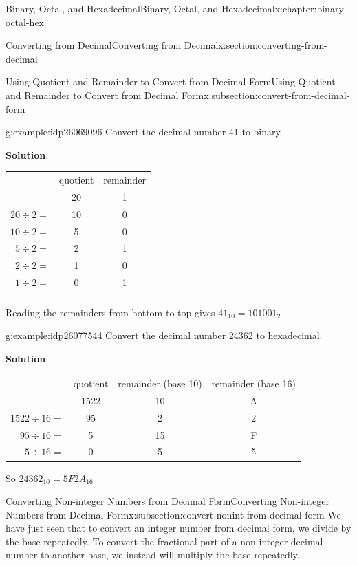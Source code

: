 \documentclass[twoside,10pt,]{book}
\newcommand{\blocktitlefont}{\relax}
\newcommand{\tabularfont}{\relax}
\numberwithin{equation}{section}
\newcommand{\hrulemedium}{\noalign{\hrule height 0.07em}}
\newcommand{\hrulethick} {\noalign{\hrule height 0.11em}}
\begin{document}
\begin{chapterptx}{Binary, Octal, and Hexadecimal}{}{Binary, Octal, and Hexadecimal}{}{}{x:chapter:binary-octal-hex}
\begin{sectionptx}{Converting from Decimal}{}{Converting from Decimal}{}{}{x:section:converting-from-decimal}
\begin{subsectionptx}{Using Quotient and Remainder to Convert from Decimal Form}{}{Using Quotient and Remainder to Convert from Decimal Form}{}{}{x:subsection:convert-from-decimal-form}
\begin{example}{}{g:example:idp26069096}%
Convert the decimal number 41 to binary.\par\smallskip%
\noindent\textbf{\blocktitlefont Solution}.\label{g:solution:idp26066920}{}\hypertarget{g:solution:idp26066920}{}\quad{}\begin{center}%
{\tabularfont%
\begin{tabular}{ccc}\hrulethick
&quotient&remainder\tabularnewline\hrulemedium
\multicolumn{1}{r}{\(41\div 2=\)}&20&1\tabularnewline[0pt]
\multicolumn{1}{r}{\(20\div 2=\)}&10&0\tabularnewline[0pt]
\multicolumn{1}{r}{\(10\div 2 =\)}&5&0\tabularnewline[0pt]
\multicolumn{1}{r}{\(5\div 2=\)}&2&1\tabularnewline[0pt]
\multicolumn{1}{r}{\(2\div 2=\)}&1&0\tabularnewline[0pt]
\multicolumn{1}{r}{\(1\div 2=\)}&0&1\tabularnewline\hrulethick
\end{tabular}
}%
\end{center}%
 Reading the remainders from bottom to top gives \(41_{10}=101001_2\)\end{example}
\begin{example}{}{g:example:idp26077544}%
Convert the decimal number 24362 to hexadecimal.\par\smallskip%
\noindent\textbf{\blocktitlefont Solution}.\label{g:solution:idp26081768}{}\hypertarget{g:solution:idp26081768}{}\quad{}\begin{center}%
{\tabularfont%
\begin{tabular}{cccc}\hrulethick
&quotient&remainder (base 10)&remainder (base 16)\tabularnewline\hrulemedium
\multicolumn{1}{r}{\(24362\div 16=\)}&1522&10&A\tabularnewline[0pt]
\multicolumn{1}{r}{\(1522\div 16=\)}&95&2&2\tabularnewline[0pt]
\multicolumn{1}{r}{\(95\div 16=\)}&5&15&F\tabularnewline[0pt]
\multicolumn{1}{r}{\(5\div 16=\)}&0&5&5
\end{tabular}
}%
\end{center}%
 So \(24362_{10}=5F2A_{16}\)\end{example}
\end{subsectionptx}
%
%
\typeout{************************************************}
\typeout{************************************************}
%
\begin{subsectionptx}{Converting Non-integer Numbers from Decimal Form}{}{Converting Non-integer Numbers from Decimal Form}{}{}{x:subsection:convert-nonint-from-decimal-form}
We have just seen that to convert an integer number from decimal form, we divide by the base repeatedly.  To convert the fractional part of a non-integer decimal number to another base, we instead will multiply the base repeatedly.%

\end{subsectionptx}
\end{sectionptx}
\end{chapterptx}
\end{document}
